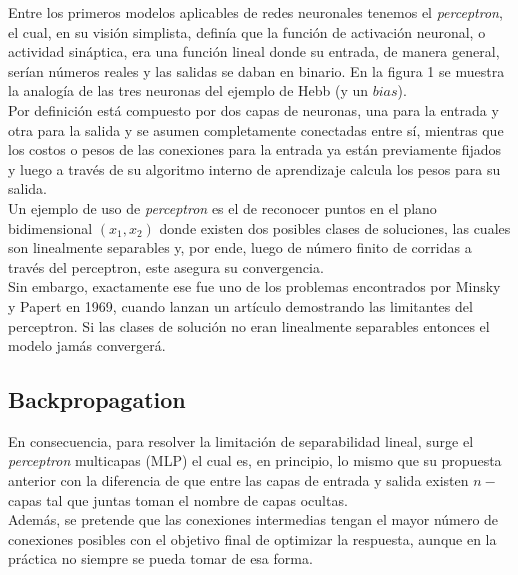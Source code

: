 \documentclass{llncs}
\begin{document}
\begin{multicols}{2}[]


Entre los primeros modelos aplicables de redes neuronales tenemos el \textit{perceptron}, el cual, en su visi\'on simplista, defin\'ia que
la funci\'on de activaci\'on neuronal, o actividad sin\'aptica, era una funci\'on lineal donde su entrada, de manera general, ser\'ian n\'umeros
reales y las salidas se daban en binario. En la figura 1 se muestra la analog\'ia de las tres neuronas del ejemplo de Hebb (y un $bias$).\\

Por definici\'on est\'a compuesto por dos capas de neuronas, una para la entrada y otra para la salida y se asumen completamente conectadas
entre s\'i, mientras que los costos o pesos de las conexiones para la entrada ya est\'an previamente fijados y luego a trav\'es de su algoritmo
interno de aprendizaje calcula los pesos para su salida. \\


Un ejemplo de uso de \textit{perceptron} es el de reconocer puntos en el plano bidimensional $(x_1, x_2)$ donde existen dos posibles clases de soluciones,
las cuales son linealmente separables y, por ende, luego de n\'umero finito de corridas a trav\'es del perceptron, este asegura su convergencia. \\

Sin embargo, exactamente ese fue uno de los problemas encontrados por Minsky y \-Papert en 1969, cuando lanzan un art\'iculo demostrando las limitantes
del perceptron. Si las clases de soluci\'on no eran linealmente separables entonces el modelo jam\'as converger\'a.

\subsection{Backpropagation}

En consecuencia, para resolver la limitaci\'on de separabilidad lineal, surge el \textit{perceptron} multicapas (MLP) el cual es, en principio, lo mismo que su propuesta
anterior con la diferencia de que entre las capas de entrada y salida existen $n-$capas tal que juntas toman el nombre de capas ocultas.\\
Adem\'as, se pretende que las conexiones intermedias tengan el mayor n\'umero de conexiones posibles con el objetivo final de optimizar la respuesta, aunque
en la pr\'actica no siempre se pueda tomar de esa forma.\\


\end{multicols}
\end{document}
